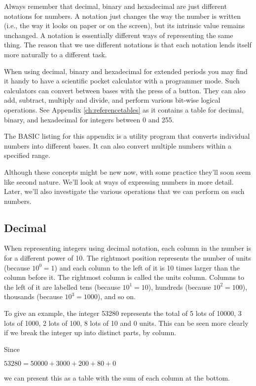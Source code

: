 Always remember that decimal, binary and hexadecimal are just different notations for numbers. A notation just changes the way the number is written (i.e., the way it looks on paper or on the screen), but its intrinsic value remains unchanged. A notation is essentially different ways of representing the same thing. The reason that we use different notations is that each notation lends itself more naturally to a different task.

When using decimal, binary and hexadecimal for extended periods you may find it handy to have a scientific pocket calculator with a programmer mode. Such calculators can convert between bases with the press of a button. They can also add, subtract, multiply and divide, and perform various bit-wise logical operations.
See Appendix \ref{ch:referencetables}   as it contains a  table for decimal, binary, and hexadecimal for integers between 0 and 255.

The BASIC listing for this appendix is a utility program that converts individual numbers into different bases. It can also convert multiple numbers within a specified range.

Although these concepts might be new now, with some practice they'll soon seem like second nature. We’ll look at ways of expressing numbers in more detail. Later, we’ll also investigate the various operations that we can perform on such numbers.

\subsection{Decimal}
When representing integers using decimal notation, each column in the number is for a different power of 10. The rightmost position represents the number of units (because $10^{0} = 1$) and each column to the left of it is 10 times larger than the column before it. The rightmost column is called the units column. Columns to the left of it are labelled tens (because $10^{1} = 10$), hundreds (because $10^{2} = 100$), thousands (because $10^{3} = 1000$), and so on.

To give an example, the integer 53280 represents the total of 5 lots of 10000, 3 lots of 1000, 2 lots of 100, 8 lots of 10 and 0 units. This can be seen more clearly if we break the integer up into distinct parts, by column.

Since
\begin{center}
  $53280 = 50000 + 3000 + 200 + 80 + 0$
\end{center}
we can present this as a table with the sum of each column at the bottom.

